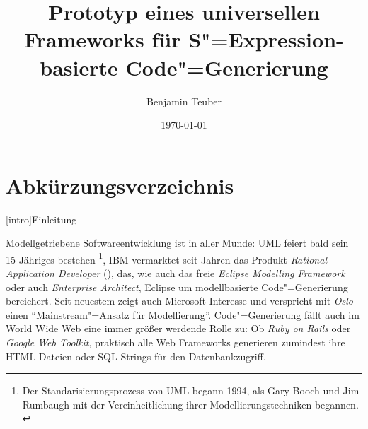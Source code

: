 \documentclass[11pt, a4paper, bibgerm]{book}
\newcommand\lchapter{}
\newcommand{\sexp}{S"=Expression}
\newcommand{\cgen}{Code"=Generierung}
\begin{document}
\begin{titlepage}
\title{Prototyp eines universellen Frameworks für
  \sexp{}-basierte \cgen{}}
\author{Benjamin Teuber}
\date{\today}

\maketitle
\end{titlepage}
\thispagestyle{empty}
\cleardoublepage


\tableofcontents

\chapter*{Abkürzungsverzeichnis}
\begin{acronym}
\end{acronym}



\lchapter[intro]{Einleitung}


Modellgetriebene Softwareentwicklung ist in aller Munde: UML
feiert bald sein 15-Jähriges bestehen \footnote{Der
  Standarisierungsprozess von UML begann 1994, als Gary Booch und Jim
  Rumbaugh mit der Vereinheitlichung ihrer Modellierungstechniken
  begannen. \cite{TODO}}, IBM vermarktet seit Jahren das Produkt
\textit{Rational Application Developer} (\cite{TODO}), das, wie auch das freie
\textit{Eclipse Modelling Framework} oder auch \textit{Enterprise
  Architect}, Eclipse um modellbasierte \cgen{}
bereichert. Seit neuestem zeigt auch Microsoft Interesse und
verspricht mit \textit{Oslo} \cite{TODO} einen ``Mainstream"=Ansatz
für Modellierung''. \cgen{} fällt auch im World Wide Web eine
immer größer werdende Rolle zu: Ob \textit{Ruby on Rails} oder
\textit{Google Web Toolkit}, praktisch alle Web Frameworks generieren
zumindest ihre HTML-Dateien oder SQL-Strings für den Datenbankzugriff.
\end{document}
